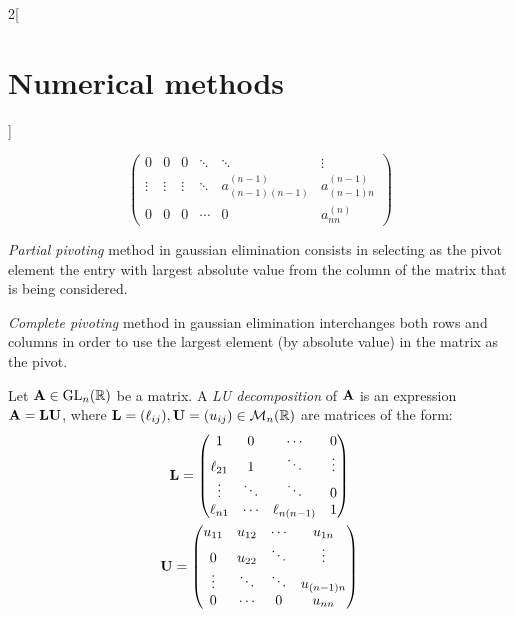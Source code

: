 \documentclass[../../../main_math.tex]{subfiles}
\begin{document}
\begin{multicols}{2}[\section{Numerical methods}]
\begin{method}
$$\begin{pmatrix}
        0            & 0            & 0            & \ddots       & \ddots                 & \vdots             \\
        \vdots       & \vdots       & \vdots       & \ddots       & a_{(n-1)(n-1)}^{(n-1)} & a_{(n-1)n}^{(n-1)} \\
        0            & 0            & 0            & \cdots       & 0                      & a_{nn}^{(n)}
      \end{pmatrix}
    $$
  \end{method}
  \begin{method}
    \emph{Partial pivoting} method in gaussian elimination consists in selecting as the pivot element the entry with largest absolute value from the column of the matrix that is being considered.
  \end{method}
  \begin{method}
    \emph{Complete pivoting} method in gaussian elimination interchanges both rows and columns in order to use the largest element (by absolute value) in the matrix as the pivot.
  \end{method}
  \begin{definition}[LU descompostion]
    Let $\boldsymbol{\mathrm{A}}\in\mathrm{GL}_n(\mathbb{R})$ be a matrix. A \emph{LU decomposition} of $\boldsymbol{\mathrm{A}}$ is an expression $\boldsymbol{\mathrm{A}}=\boldsymbol{\mathrm{L}}\boldsymbol{\mathrm{U}}$, where $\boldsymbol{\mathrm{L}}=(\ell_{ij}),\boldsymbol{\mathrm{U}}=(u_{ij})\in\mathcal{M}_n(\mathbb{R})$ are matrices of the form:
    \begin{gather}\label{NM_L}
      \boldsymbol{\mathrm{L}}=
      \begin{pmatrix}
        1         & 0      & \cdots        & 0      \\
        \ell_{21} & 1      & \ddots        & \vdots \\
        \vdots    & \ddots & \ddots        & 0      \\
        \ell_{n1} & \cdots & \ell_{n(n-1)} & 1
      \end{pmatrix}\\\label{NM_U}
      \boldsymbol{\mathrm{U}}=
      \begin{pmatrix}
        u_{11} & u_{12} & \cdots & u_{1n}     \\
        0      & u_{22} & \ddots & \vdots     \\
        \vdots & \ddots & \ddots & u_{(n-1)n} \\
        0      & \cdots & 0      & u_{nn}
      \end{pmatrix}
    \end{gather}
  \end{definition}
  \begin{lemma}

\end{lemma}
\end{multicols}
\end{document}
